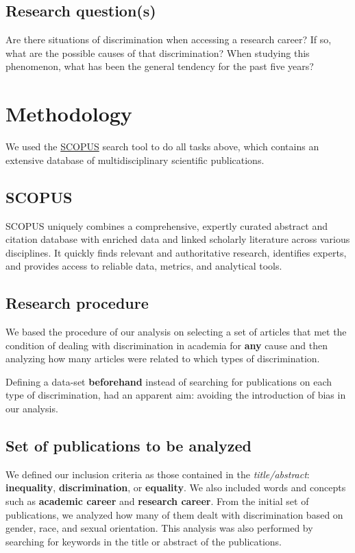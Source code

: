 \documentclass[runningheads]{llncs}
\begin{document}
\subsection{Research question(s)}
Are there situations of discrimination when accessing a research career? If so, what are the possible causes of that discrimination? When studying this phenomenon, what has been the general tendency for the past five years?
\section{Methodology}
We used the \href{https://www.scopus.com/}{SCOPUS} search tool to do all tasks above, which contains an extensive database of multidisciplinary scientific publications.
\subsection{SCOPUS}
SCOPUS uniquely combines a comprehensive, expertly curated abstract and citation database with enriched data and linked scholarly literature across various disciplines. It quickly finds relevant and authoritative research, identifies experts, and provides access to reliable data, metrics, and analytical tools.
\subsection{Research procedure}
We based the procedure of our analysis on selecting a set of articles that met the condition of dealing with discrimination in academia for \textbf{any} cause and then analyzing how many articles were related to which types of discrimination. 

Defining a data-set \textbf{beforehand} instead of searching for publications on each type of discrimination, had an apparent aim: avoiding the introduction of bias in our analysis.

\subsection{Set of publications to be analyzed} 
We defined our inclusion criteria as those contained in the \textit{title/abstract}: \textbf{inequality}, \textbf{discrimination}, or \textbf{equality}. We also included words and concepts such as \textbf{academic career} and \textbf{research career}. From the initial set of publications, we analyzed how many of them dealt with discrimination based on gender, race, and sexual orientation. This analysis was also performed by searching for keywords in the title or abstract of the publications. 
\end{document}
